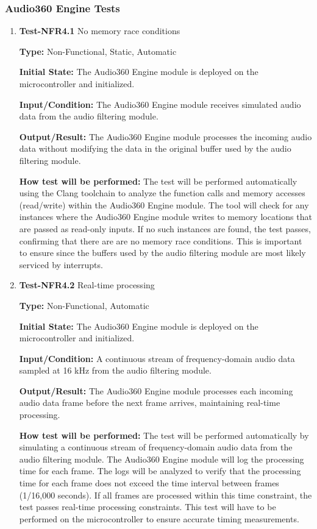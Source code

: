 \documentclass[12pt, titlepage]{article}
\begin{document}
\subsubsection{Audio360 Engine Tests}

\begin{enumerate}
\item{\textbf{Test-NFR4.1} No memory race conditions\\}

\textbf{Type:} Non-Functional, Static, Automatic

\textbf{Initial State:}
The Audio360 Engine module is deployed on the microcontroller and initialized.

\textbf{Input/Condition:}
The Audio360 Engine module receives simulated audio data from the audio
filtering module.

\textbf{Output/Result:}
The Audio360 Engine module processes the incoming audio data without modifying
the data in the original buffer used by the audio filtering module. 

\textbf{How test will be performed:}
The test will be performed automatically using the Clang toolchain to analyze
the function calls and memory accesses (read/write) within the Audio360 Engine
module. The tool will check for any instances where the Audio360 Engine module
writes to memory locations that are passed as read-only inputs. If no such
instances are found, the test passes, confirming that there are are no memory
race conditions. This is important to ensure since the buffers used by the audio
filtering module are most likely serviced by interrupts. 

\item{\textbf{Test-NFR4.2} Real-time processing\\}

\textbf{Type:} Non-Functional, Automatic

\textbf{Initial State:}
The Audio360 Engine module is deployed on the microcontroller and initialized.

\textbf{Input/Condition:}
A continuous stream of frequency-domain audio data sampled at 16 kHz from the
audio filtering module.

\textbf{Output/Result:}
The Audio360 Engine module processes each incoming audio data frame before the
next frame arrives, maintaining real-time processing.

\textbf{How test will be performed:}
The test will be performed automatically by simulating a continuous stream of
frequency-domain audio data from the audio filtering module. The Audio360 Engine
module will log the processing time for each frame. The logs will be analyzed to
verify that the processing time for each frame does not exceed the time interval
between frames (1/16,000 seconds). If all frames are processed within this time
constraint, the test passes real-time processing constraints. This test will
have to be performed on the microcontroller to ensure accurate timing
measurements.


\end{enumerate}
\end{document}
